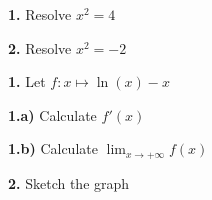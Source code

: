 \documentclass{article}
\begin{document}
\textbf{1. } Resolve $x^2=4$


\textbf{2. } Resolve $x^2=-2$







\textbf{1. } Let $f: x \mapsto \ln(x)-x$




\textbf{1.a) } Calculate $f'(x)$


\textbf{1.b) } Calculate $\displaystyle\lim_{x\to +\infty}f(x)$




\textbf{2. } Sketch the graph
\end{document}
